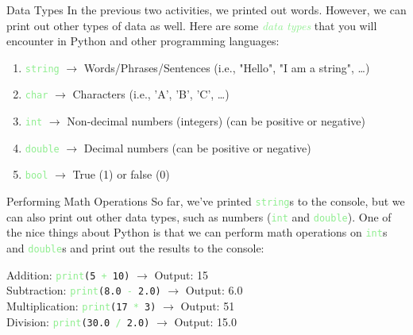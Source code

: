\documentclass[hyperref={pdfpagemode=FullScreen},aspectratio=169]{beamer}
\begin{document}
  \begin{frame}{Data Types}
    In the previous two activities, we printed out words. However, we can print out other types of data as well. Here are some \textit{\textcolor{lightGreen}{data types}} that you will encounter in Python and other programming languages: 

    \begin{enumerate}
      \item \textcolor{lightGreen}{\texttt{string}} $\rightarrow$ Words/Phrases/Sentences (i.e., "Hello", "I am a string", \ldots) 
      \item \textcolor{lightGreen}{\texttt{char}} $\rightarrow$ Characters (i.e., 'A', 'B', 'C', \ldots)
      \item \textcolor{lightGreen}{\texttt{int}} $\rightarrow$ Non-decimal numbers (integers) (can be positive or negative)
      \item \textcolor{lightGreen}{\texttt{double}} $\rightarrow$ Decimal numbers (can be positive or negative) 
      \item \textcolor{lightGreen}{\texttt{bool}} $\rightarrow$ True (1) or false (0)
    \end{enumerate}
  \end{frame}

  \begin{frame}{Performing Math Operations}
    So far, we've printed \texttt{\textcolor{lightGreen}{string}}s to the console, but we can also print out other data types, such as numbers (\textcolor{lightGreen}{\texttt{int}} and \textcolor{lightGreen}{\texttt{double}}). One of the nice things about Python is that we can perform math operations on \texttt{\textcolor{lightGreen}{int}}s and \texttt{\textcolor{lightGreen}{double}}s and print out the results to the console:  
 
    \begin{center}
      Addition: \textcolor{lightGreen}{\texttt{print}}\texttt{(5 \textcolor{lightGreen}{+} 10)} $\rightarrow$ Output: 15\\
      Subtraction: \textcolor{lightGreen}{\texttt{print}}\texttt{(8.0 \textcolor{lightGreen}{-} 2.0)} $\rightarrow$ Output: 6.0\\
      Multiplication: \textcolor{lightGreen}{\texttt{print}}\texttt{(17 \textcolor{lightGreen}{*} 3)} $\rightarrow$ Output: 51\\
      Division: \textcolor{lightGreen}{\texttt{print}}\texttt{(30.0 \textcolor{lightGreen}{\slash} 2.0)} $\rightarrow$ Output: 15.0
    \end{center}
  \end{frame}
\end{document}

